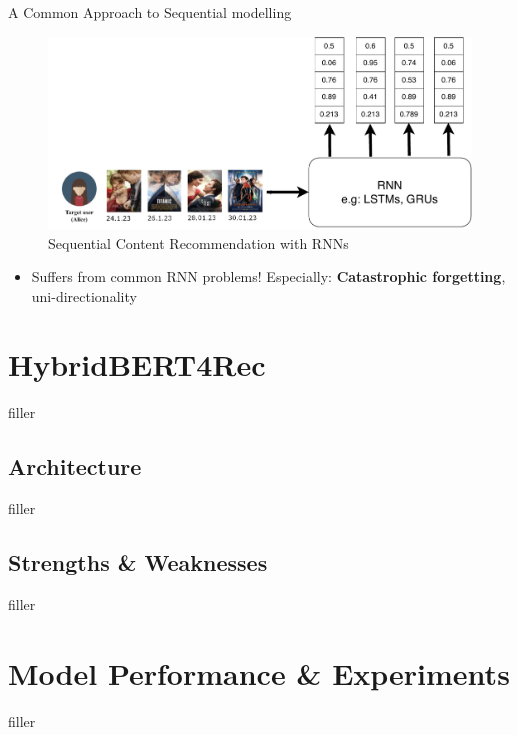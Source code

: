\documentclass[en]{sdqbeamer}
\begin{document}
\begin{frame}{A Common Approach to Sequential modelling}
	\begin{figure}
		\includegraphics[height=0.45\textheight]{images/rnn_seq.pdf}
		\caption{Sequential Content Recommendation with RNNs}
	\end{figure}
	\begin{itemize}
		\item Suffers from common RNN problems! Especially: \textbf{Catastrophic forgetting}, uni-directionality
	\end{itemize}
\end{frame}

\section{HybridBERT4Rec}
\begin{frame}
	filler
\end{frame}

\subsection{Architecture}
\begin{frame}
	filler
\end{frame}

\subsection{Strengths \& Weaknesses}
\begin{frame}
	filler
\end{frame}

\section{Model Performance \& Experiments}
\begin{frame}
	filler
\end{frame}
\end{document}
